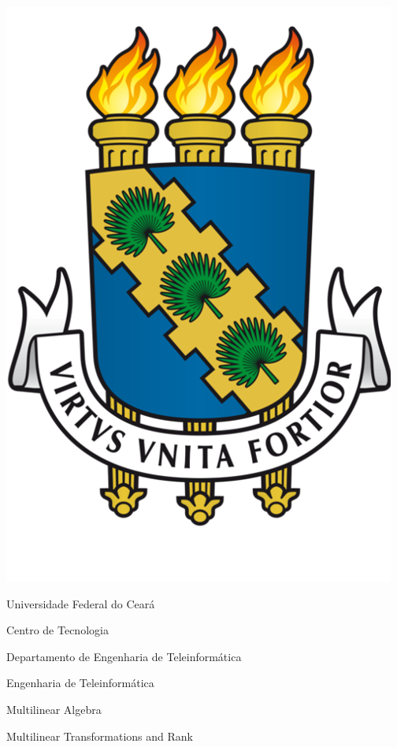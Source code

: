 \thispagestyle{empty}

\begin{center}
  
    \includegraphics[scale=0.10]{figs/icon.png}
    
    \LARGE{Universidade Federal do Ceará}
    
    \LARGE{Centro de Tecnologia}
    
    \LARGE{Departamento de Engenharia de Teleinformática}
    
    \LARGE{Engenharia de Teleinformática}
    
    \vspace{180pt}
      
    \LARGE{Multilinear Algebra}
      
    \LARGE{Multilinear Transformations and Rank}
      
    \vspace{100pt}
    
\end{center}


